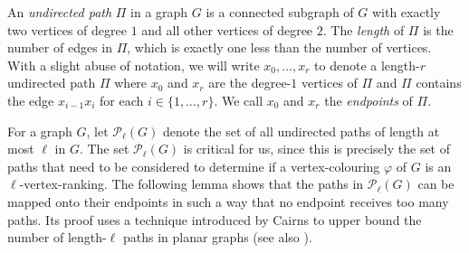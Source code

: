 \documentclass{patmorin}
\newcommand{\defin}[1]{\emph{\color{brightmaroon}#1}}
\newcommand{\rn}[1]{\chi_{\operatorname{#1-vr}}}
\newcommand{\lrn}{\rn{\ell}}
\begin{document}
%
%
%


An \defin{undirected path} $\Pi$ in a graph $G$ is a connected subgraph of $G$ with exactly two vertices of degree $1$ and all other vertices of degree $2$.  The \defin{length} of $\Pi$ is the number of edges in $\Pi$, which is exactly one less than the number of vertices.  With a slight abuse of notation, we will write $x_0,\ldots,x_r$ to denote a length-$r$ undirected path $\Pi$ where $x_0$ and $x_r$ are the degree-$1$ vertices of $\Pi$ and $\Pi$ contains the edge $x_{i-1}x_i$ for each $i\in\{1,\ldots,r\}$. We call $x_0$ and $x_r$ the \defin{endpoints} of $\Pi$.

For a graph $G$, let $\mathcal{P}_\ell(G)$ denote the set of all undirected paths of length at most $\ell$ in $G$.  The set $\mathcal{P}_\ell(G)$ is critical for us, since this is precisely the set of paths that need to be considered to determine if a vertex-colouring $\varphi$ of $G$ is an $\ell$-vertex-ranking.  The following lemma shows that the paths in $\mathcal{P}_\ell(G)$ can be mapped onto their endpoints in such a way that no endpoint receives too many paths.  Its proof uses a technique introduced by Cairns \cite{?} to upper bound the number of length-$\ell$ paths in planar graphs (see also \cite[Lemma~5]{devroye.dujmovic.ea:notes}).
\end{document}
